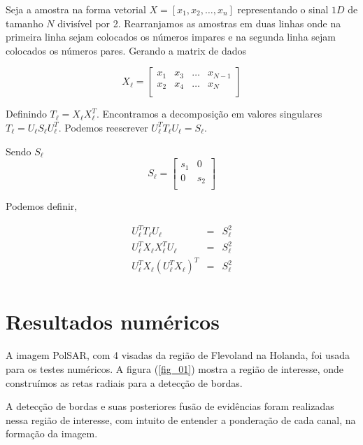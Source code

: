 \documentclass[conference]{IEEEtran}
\begin{document}
Seja a amostra na forma vetorial $X=[x_1,x_2,\dots,x_n]$ representando o sinal $1D$ de tamanho $N$ divisível por 2. Rearranjamos as amostras em duas linhas onde na primeira linha sejam colocados os números impares e na segunda linha sejam colocados os números pares. Gerando a matrix de dados


\begin{equation*}
	X_{\ell} = \left[
\begin{array}{cccc}
	x_1   & x_3 & \dots & x_{N-1}  \\
	x_2   & x_4 & \dots & x_N  \\
\end{array}
\right]
\end{equation*}

Definindo $T_{\ell} = X_{\ell}X_{\ell}^T$. Encontramos a decomposição em valores singulares $T_{\ell}=U_{\ell}S_{\ell}U_{\ell}^T$. Podemos reescrever $U_{\ell}^TT_{\ell}U_{\ell}=S_{\ell}$.

Sendo $S_{\ell}$
\begin{equation*}
	S_{\ell} = \left[
\begin{array}{cc}
	s_1   & 0 \\
	0   & s_2   \\
\end{array}
\right]
\end{equation*}

Podemos definir,
  
\begin{equation*}
\begin{array}{ccc}
	U_{\ell}^TT_{\ell}U_{\ell}&=&S_{\ell}^2 \\
	U_{\ell}^TX_{\ell}X_{\ell}^TU_{\ell}&=&S_{\ell}^2 \\
	U_{\ell}^TX_{\ell}(U_{\ell}^TX_{\ell})^T&=&S_{\ell}^2 \\
\end{array}
\end{equation*}
  
\section{Resultados numéricos}\label{sec_07}

A imagem PolSAR, com 4 visadas da região de Flevoland na Holanda, foi usada para os testes numéricos. A figura (\ref{fig_01}) mostra a região de interesse, onde construímos as retas radiais para a detecção de bordas.

 A detecção de bordas e suas posteriores fusão de evidências foram realizadas nessa região de interesse, com intuito de entender a ponderação de cada canal, na formação da imagem.
\end{document}
